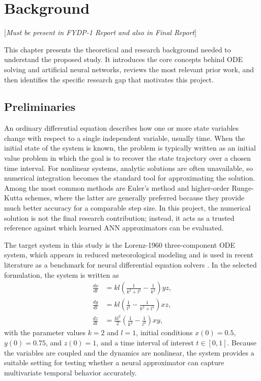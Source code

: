 \chapter{Background}

[\textit{Must be present in FYDP-1 Report and also in Final Report}]

This chapter presents the theoretical and research background needed to understand the proposed study. It introduces the core concepts behind ODE solving and artificial neural networks, reviews the most relevant prior work, and then identifies the specific research gap that motivates this project.

\section{Preliminaries}
An ordinary differential equation describes how one or more state variables change with respect to a single independent variable, usually time. When the initial state of the system is known, the problem is typically written as an initial value problem in which the goal is to recover the state trajectory over a chosen time interval. For nonlinear systems, analytic solutions are often unavailable, so numerical integration becomes the standard tool for approximating the solution. Among the most common methods are Euler's method and higher-order Runge-Kutta schemes, where the latter are generally preferred because they provide much better accuracy for a comparable step size. In this project, the numerical solution is not the final research contribution; instead, it acts as a trusted reference against which learned ANN approximators can be evaluated.

The target system in this study is the Lorenz-1960 three-component ODE system, which appears in reduced meteorological modeling and is used in recent literature as a benchmark for neural differential equation solvers \cite{matthews2025pinnde}. In the selected formulation, the system is written as
\begin{align}
\frac{dx}{dt} &= kl\left(\frac{1}{k^2+l^2}-\frac{1}{k^2}\right)yz, \\
\frac{dy}{dt} &= kl\left(\frac{1}{l^2}-\frac{1}{k^2+l^2}\right)xz, \\
\frac{dz}{dt} &= \frac{kl^2}{2}\left(\frac{1}{k^2}-\frac{1}{l^2}\right)xy,
\end{align}
with the parameter values $k=2$ and $l=1$, initial conditions $x(0)=0.5$, $y(0)=0.75$, and $z(0)=1$, and a time interval of interest $t \in [0,1]$. Because the variables are coupled and the dynamics are nonlinear, the system provides a suitable setting for testing whether a neural approximator can capture multivariate temporal behavior accurately.

